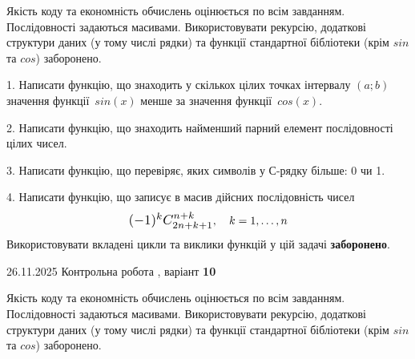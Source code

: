 \documentclass[11pt, ukrainian]{article}
\begin{document}
{{{{{{{{%

{
Якість коду та економність обчислень оцінюється по всім завданням. Послідовності задаються масивами. Використовувати рекурсію, додаткові структури даних (у тому числі рядки) та функції стандартної бібліотеки (крім $sin$ та $cos$) заборонено.

\vspace{2mm}

\begin {large}
1. Написати функцію, що знаходить у скількох цілих точках інтервалу $(a; b)$ значення функції~$sin(x)$ менше за значення функції~$cos(x)$.

\vspace{2mm}


2. Написати функцію, що знаходить найменший парний елемент послідовності цілих чисел.

\vspace{2mm}


3. Написати функцію, що перевіряє, яких символів у С-рядку більше: 0 чи 1.

\vspace{2mm}


4. 
Написати функцію, що записує в масив дійсних послідовність чисел
$$\scalebox{1.2}{$(-1)^{k}C_{2n+k+1}^{n+k}$}, \quad k=1,\ldots,n$$
\quad Використовувати вкладені цикли та виклики функцій у цій задачі \textbf{заборонено}.

\vspace{2mm}

\end{large}
\newpage
{{26.11.2025 Контрольна робота , варіант  \No \textbf { 10 }\par}}


{
Якість коду та економність обчислень оцінюється по всім завданням. Послідовності задаються масивами. Використовувати рекурсію, додаткові структури даних (у тому числі рядки) та функції стандартної бібліотеки (крім $sin$ та $cos$) заборонено.

}}}}}}}}}}
\end{document}
